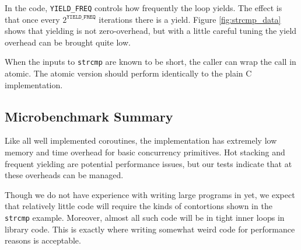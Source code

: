 \documentclass[acmsmall,anonymous,review]{acmart}\settopmatter{printfolios=true,printccs=false,printacmref=false}
\begin{document}

In the code, \texttt{YIELD\_FREQ} controls how frequently the loop yields.
The effect is that once every $2^{\mathtt{YIELD\_FREQ}}$ iterations there is a yield.
Figure \ref{fig:strcmp_data} shows that yielding is not zero-overhead, but with a little careful tuning the yield overhead can be brought quite low.

When the inputs to \texttt{strcmp} are known to be short, the caller can wrap the call in atomic.
The atomic version should perform identically to the plain C implementation.


\subsection{Microbenchmark Summary}

Like all well implemented coroutines, the \charcoal{} implementation has extremely low memory and time overhead for basic concurrency primitives.
Hot stacking and frequent yielding are potential performance issues, but our tests indicate that at these overheads can be managed.

Though we do not have experience with writing large programs in \charcoal{} yet, we expect that relatively little code will require the kinds of contortions shown in the \texttt{strcmp} example.
Moreover, almost all such code will be in tight inner loops in library code.
This is exactly where writing somewhat weird code for performance reasons is acceptable.
\end{document}
